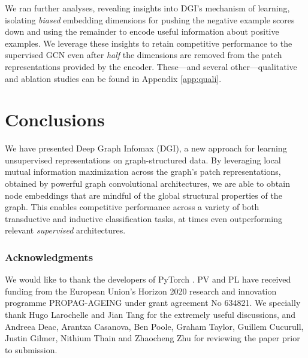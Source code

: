 \documentclass{article} \usepackage{iclr2019_conference,times}
\begin{document}
We ran further analyses, revealing insights into DGI's mechanism of learning, isolating \emph{biased} embedding dimensions for pushing the negative example scores down and using the remainder to encode useful information about positive examples. We leverage these insights to retain competitive performance to the supervised GCN even after \emph{half} the dimensions are removed from the patch representations provided by the encoder. These---and several other---qualitative and ablation studies can be found in Appendix \ref{app:quali}.











\section{Conclusions}

We have presented Deep Graph Infomax (DGI), a new approach for learning unsupervised representations on graph-structured data. By leveraging local mutual information maximization across the graph's patch representations, obtained by powerful graph convolutional architectures, we are able to obtain node embeddings that are mindful of the global structural properties of the graph. This enables competitive performance across a variety of both transductive and inductive classification tasks, at times even outperforming relevant \emph{supervised} architectures.

\newpage
\subsubsection*{Acknowledgments}
We would like to thank the developers of PyTorch \citep{paszke2017automatic}. PV and PL have received funding from the European Union's Horizon 2020 research and innovation programme PROPAG-AGEING under grant agreement No 634821. We specially thank Hugo Larochelle and Jian Tang for the extremely useful discussions, and Andreea Deac, Arantxa Casanova, Ben Poole, Graham Taylor, Guillem Cucurull, Justin Gilmer, Nithium Thain and Zhaocheng Zhu for reviewing the paper prior to submission.
\end{document}
